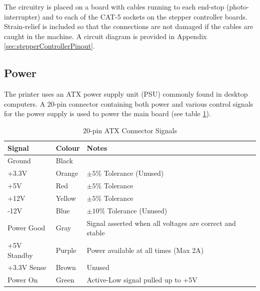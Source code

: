 			The circuitry is placed on a board with cables running to each end-stop
			(photo-interrupter) and to each of the CAT-5 sockets on the stepper
			controller boards. Strain-relief is included so that the connections are
			not damaged if the cables are caught in the machine. A circuit diagram
			is provided in Appendix \ref{sec:stepperControllerPinout}.
			
			
			
			
		\subsection{Power}
			
			The printer uses an ATX power supply unit (PSU) commonly found in
			desktop computers. A 20-pin connector containing both power and various
			control signals for the power supply is used to power the main board
			(see table \ref{tab:atxConnectors}).
			
			\begin{table}[here]
				\centering
				\begin{tabular}{l l l}
					\toprule
					Signal & Colour & Notes\\
					\midrule
					Ground & Black  & \\
					+3.3V  & Orange & $\pm5\%$  Tolerance (Unused) \\
					+5V    & Red    & $\pm5\%$  Tolerance \\
					+12V   & Yellow & $\pm5\%$  Tolerance \\
					-12V   & Blue   & $\pm10\%$ Tolerance (Unused) \\
					\addlinespace
					Power Good  & Gray   & Signal asserted when all voltages are correct
					                       and stable \\
					+5V Standby & Purple & Power available at all times (Max 2A) \\
					+3.3V Sense & Brown  & Unused \\
					Power On    & Green  & Active-Low signal pulled up to +5V \\
					
					\bottomrule
				\end{tabular}
				
				\caption{20-pin ATX Connector Signals\cite{ATX}}
				\label{tab:atxConnectors}
			\end{table}
			

